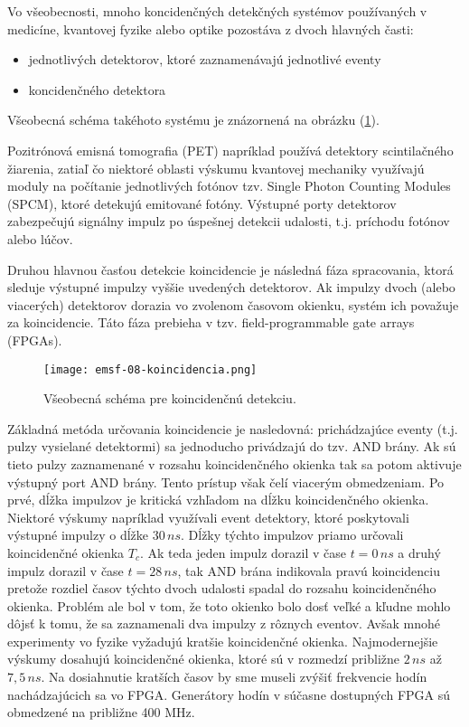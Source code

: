 \documentclass[../../main.tex]{subfiles}
\begin{document}
Vo všeobecnosti, mnoho koncidenčných detekčných systémov používaných v medicíne, kvantovej fyzike alebo optike pozostáva z dvoch hlavných časti: 
\begin{itemize}
\item jednotlivých detektorov, ktoré zaznamenávajú jednotlivé eventy 
\item koncidenčného detektora
\end{itemize}
Všeobecná schéma takéhoto systému je znázornená na obrázku (\ref{em8:fig:koncidencia}). 

Pozitrónová emisná tomografia (PET) napríklad používá detektory scintilačného žiarenia, zatiaľ čo niektoré oblasti výskumu kvantovej mechaniky využívajú moduly na počítanie jednotlivých fotónov tzv. Single Photon Counting Modules  (SPCM), ktoré detekujú emitované fotóny. Výstupné porty detektorov zabezpečujú signálny impulz po úspešnej detekcii udalosti, t.j. príchodu fotónov alebo lúčov.

Druhou hlavnou časťou detekcie koincidencie je následná fáza spracovania, ktorá sleduje výstupné impulzy vyššie uvedených detektorov. Ak impulzy dvoch (alebo viacerých) detektorov dorazia vo zvolenom časovom okienku, systém ich považuje za koincidencie.
Táto fáza prebieha v tzv. field-programmable gate arrays (FPGAs).

\begin{figure}[!h]
\texttt{[image: emsf-08-koincidencia.png]}
\centering
\caption{Všeobecná schéma pre koincidenčnú detekciu.}
\label{em8:fig:koncidencia}
\end{figure}

Základná metóda určovania koincidencie je nasledovná: prichádzajúce eventy (t.j. pulzy vysielané detektormi) sa jednoducho privádzajú do tzv. AND brány. Ak sú tieto pulzy zaznamenané v rozsahu koincidenčného okienka tak sa potom aktivuje výstupný port AND brány. Tento prístup však čelí viacerým obmedzeniam. Po prvé, dĺžka impulzov je kritická vzhľadom na dĺžku koincidenčného okienka. Niektoré výskumy napríklad využívali event detektory, ktoré poskytovali výstupné impulzy o dĺžke $30\,ns$. Dĺžky týchto impulzov priamo určovali koincidenčné okienka $T_c$. Ak teda jeden impulz dorazil v čase $t=0\,ns$ a druhý impulz dorazil v čase $t=28\,ns$, tak AND brána indikovala pravú koincidenciu pretože rozdiel časov týchto dvoch udalosti spadal do rozsahu koincidenčného okienka. Problém ale bol v tom, že toto okienko bolo dosť veľké a kľudne mohlo dôjsť k tomu, že sa zaznamenali dva impulzy z rôznych eventov. Avšak mnohé experimenty vo fyzike vyžadujú kratšie koincidenčné okienka. Najmodernejšie výskumy dosahujú koincidenčné okienka, ktoré sú v rozmedzí približne $2\,ns$ až $7,5\,ns$. Na dosiahnutie kratších časov by sme museli zvýšiť frekvencie hodín nachádzajúcich sa vo FPGA. Generátory hodín v súčasne dostupných FPGA sú obmedzené na približne 400 MHz. 
\end{document}

